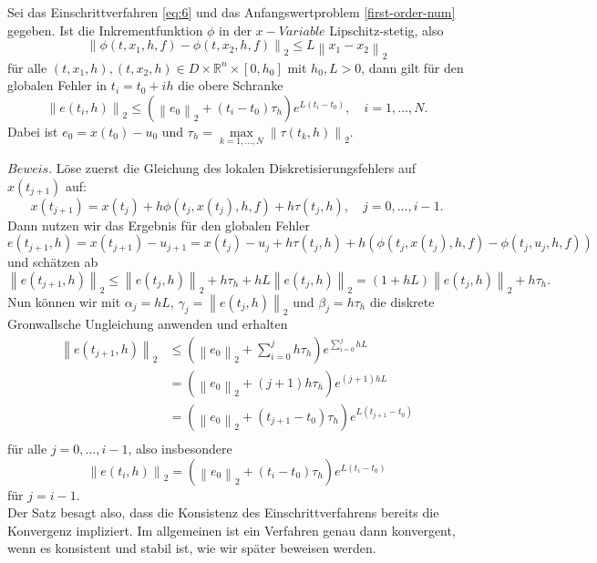 \begin{satz}
    \label{one-step-error-bound}
    Sei das Einschrittverfahren \eqref{eq:6} und das Anfangswertproblem \eqref{first-order-num} gegeben. Ist  die
    Inkrementfunktion $\phi$ in der $x-Variable$ Lipschitz-stetig, also
    \[
        \left\lVert \phi(t, x_1, h, f) - \phi(t, x_2, h, f) \right\rVert_2 \leq L \left\lVert x_1 - x_2 \right\rVert_2
    \]
    für alle $(t, x_1, h),(t, x_2, h) \in D \times \mathbb{R}^n \times [0, h_0]$ mit $h_0, L>0$, dann gilt für den
    globalen Fehler in $t_i = t_0 + ih$ die obere Schranke
    \[
        \left\lVert e(t_i,h) \right\rVert_2 \leq \left( \left\lVert e_0 \right\rVert_2 + (t_i-t_0)\tau_h \right)
        e^{L(t_i-t_0)}, \quad i = 1, \dots, N.
    \]
    Dabei ist $e_0 = x(t_0)-u_0$ und $\tau_h= \max\limits_{k=1,\dots,N} \left\lVert \tau(t_k,h) \right\rVert_2 $.
\end{satz}
$Beweis.$ Löse zuerst die Gleichung des lokalen Diskretisierungsfehlers auf $x(t_{j+1})$ auf:
\[
    x(t_{j+1}) = x(t_j) + h \phi(t_j, x(t_j),h,f) + h \tau(t_j, h), \quad j = 0, \dots , i-1.
\]
Dann nutzen wir das Ergebnis für den globalen Fehler
\[
    e(t_{j+1},h) = x(t_{j+1}) - u_{j+1} = x(t_j) - u_j + h \tau(t_j, h)
    + h \left( \phi(t_j, x(t_j),h,f) - \phi(t_j, u_j, h, f) \right)
\]
und schätzen ab
\[
    \left\lVert e(t_{j+1},h) \right\rVert_2 \leq \left\lVert e(t_j, h) \right\rVert_2 + h\tau_h
    + hL\left\lVert e(t_j,h) \right\rVert_2 = (1 + hL) \left\lVert e(t_j,h) \right\rVert_2 + h\tau_h.
\]
Nun können wir mit $\alpha_j=hL$, $\gamma_j =\left\lVert e(t_j,h) \right\rVert_2$ und $\beta_j = h\tau_h$ die diskrete
Gronwallsche Ungleichung anwenden und erhalten
\begin{align*}
    \left\lVert e(t_{j+1},h) \right\rVert_2
    &\leq ( \left\lVert e_0 \right\rVert_2 + \sum_{i=0}^{j} h\tau_h ) e^{\sum_{i=0}^{j} hL } \\
    &= \left( \left\lVert e_0 \right\rVert_2 + (j+1)h \tau_h \right)e^{(j+1)hL} \\
    &= \left( \left\lVert e_0 \right\rVert_2 + (t_{j+1} - t_0) \tau_h \right)e^{L(t_{j+1} - t_0)} \\
\end{align*}
für alle $j=0, \dots, i-1$, also insbesondere
\[
    \left\lVert e(t_{i},h) \right\rVert_2
    = \left( \left\lVert e_0 \right\rVert_2 + (t_{i} - t_0) \tau_h \right)e^{L(t_{i} - t_0)}
\]
für $j=i-1$.\qedwhite\\
Der Satz besagt also, dass die Konsistenz des Einschrittverfahrens bereits die Konvergenz impliziert. Im allgemeinen ist
ein Verfahren genau dann konvergent, wenn es konsistent und stabil ist, wie wir später beweisen werden.

